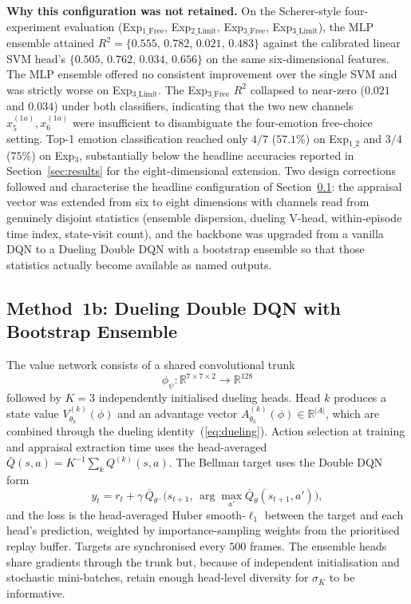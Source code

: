 \documentclass[conference]{IEEEtran}
\begin{document}
\textbf{Why this configuration was not retained.} On the
Scherer-style four-experiment evaluation
(Exp$_{\text{1\_Free}}$, Exp$_{\text{2\_Limit}}$,
Exp$_{\text{3\_Free}}$, Exp$_{\text{3\_Limit}}$), the MLP ensemble
attained $R^{2} = \{0.555,\, 0.782,\, 0.021,\, 0.483\}$ against the
calibrated linear SVM head's $\{0.505,\, 0.762,\, 0.034,\, 0.656\}$ on
the same six-dimensional features. The MLP ensemble offered no
consistent improvement over the single SVM and was strictly worse on
Exp$_{\text{3\_Limit}}$. The Exp$_{\text{3\_Free}}$ $R^{2}$ collapsed
to near-zero ($0.021$ and $0.034$) under both classifiers, indicating
that the two new channels $x_{5}^{(1a)}, x_{6}^{(1a)}$ were
insufficient to disambiguate the four-emotion free-choice setting.
Top-1 emotion classification reached only $4/7$ ($57.1\%$) on
Exp$_{\text{1\_2}}$ and $3/4$ ($75\%$) on Exp$_{\text{3}}$,
substantially below the headline accuracies reported in
Section~\ref{sec:results} for the eight-dimensional extension. Two
design corrections followed and characterise the headline
configuration of Section~\ref{sec:method1b}: the appraisal vector was
extended from six to eight dimensions with channels read from
genuinely disjoint statistics (ensemble dispersion, dueling V-head,
within-episode time index, state-visit count), and the backbone was
upgraded from a vanilla DQN to a Dueling Double DQN with a bootstrap
ensemble so that those statistics actually become available as named
outputs.

\subsection{Method~1b: Dueling Double DQN with Bootstrap Ensemble}
\label{sec:method1b}
The value network consists of a shared convolutional trunk
\begin{equation}
\phi_{\psi}: \mathbb{R}^{7\times 7\times 2} \to \mathbb{R}^{128}
\end{equation}
followed by $K = 3$ independently initialised dueling heads. Head $k$ produces
a state value $V^{(k)}_{\theta_{k}}(\phi)$ and an advantage vector
$A^{(k)}_{\theta_{k}}(\phi) \in \mathbb{R}^{|A|}$, which are combined through
the dueling identity~(\ref{eq:dueling}). Action selection at training and
appraisal extraction time uses the head-averaged $\bar Q(s,a) = K^{-1}\sum_{k}
Q^{(k)}(s,a)$. The Bellman target uses the Double DQN form
\begin{equation}
y_{t} = r_{t} + \gamma\, \bar Q_{\theta^{-}}\!\big(s_{t+1},\, \arg\max_{a'} \bar Q_{\theta}(s_{t+1}, a')\big),
\end{equation}
and the loss is the head-averaged Huber smooth-$\ell_{1}$ between the target
and each head's prediction, weighted by importance-sampling weights from the
prioritised replay buffer. Targets are synchronised every $500$ frames. The
ensemble heads share gradients through the trunk but, because of independent
initialisation and stochastic mini-batches, retain enough head-level diversity
for $\sigma_{K}$ to be informative.
\end{document}
